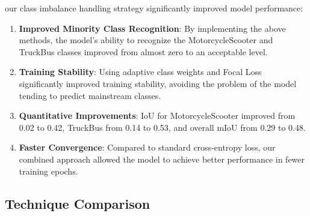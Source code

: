 \documentclass[conference]{IEEEtran}
\begin{document}

our class imbalance handling strategy significantly improved model performance:

\begin{enumerate}
    \item \textbf{Improved Minority Class Recognition}: By implementing the above methods, the model's ability to recognize the MotorcycleScooter and TruckBus classes improved from almost zero to an acceptable level.

    \item \textbf{Training Stability}: Using adaptive class weights and Focal Loss significantly improved training stability, avoiding the problem of the model tending to predict mainstream classes.
    
    \item \textbf{Quantitative Improvements}: IoU for MotorcycleScooter improved from 0.02 to 0.42, TruckBus from 0.14 to 0.53, and overall mIoU from 0.29 to 0.48.

    \item \textbf{Faster Convergence}: Compared to standard cross-entropy loss, our combined approach allowed the model to achieve better performance in fewer training epochs.
\end{enumerate}

\subsection{Technique Comparison}




\end{document}
